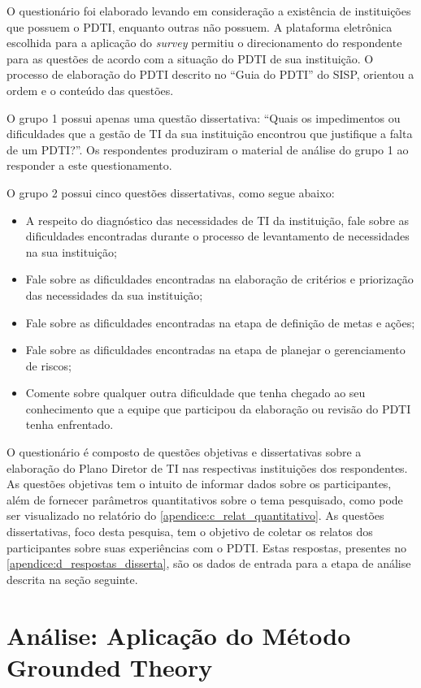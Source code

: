O questionário foi elaborado levando em consideração a existência de instituições que possuem o PDTI, enquanto outras não possuem. A plataforma eletrônica escolhida para a aplicação do \textit{survey} permitiu o direcionamento do respondente para as questões de acordo com a situação do PDTI de sua instituição. O processo de elaboração do PDTI descrito no ``Guia do PDTI'' do SISP, orientou a ordem e o conteúdo das questões.

O grupo 1 possui apenas uma questão dissertativa: ``Quais os impedimentos ou dificuldades que a gestão de TI da sua instituição encontrou que justifique a falta de um PDTI?''. Os respondentes produziram o material de análise do grupo 1 ao responder a este questionamento.

O grupo 2 possui cinco questões dissertativas, como segue abaixo:
\begin{itemize}
\item A respeito do diagnóstico das necessidades de TI da instituição, fale sobre as dificuldades encontradas durante o processo de levantamento de necessidades na sua instituição;
\item Fale sobre as dificuldades encontradas na elaboração de critérios e priorização das necessidades da sua instituição;
\item Fale sobre as dificuldades encontradas na etapa de definição de metas e ações;
\item Fale sobre as dificuldades encontradas na etapa de planejar o gerenciamento de riscos;
\item Comente sobre qualquer outra dificuldade que tenha chegado ao seu conhecimento que a equipe que participou da elaboração ou revisão do PDTI tenha enfrentado.
\end{itemize}

O questionário é composto de questões objetivas e dissertativas sobre a elaboração do Plano Diretor de TI nas respectivas instituições dos respondentes. As questões objetivas tem o intuito de informar dados sobre os participantes, além de fornecer parâmetros quantitativos sobre o tema pesquisado, como pode ser visualizado no relatório do \autoref{apendice:c_relat_quantitativo}. As questões dissertativas, foco desta pesquisa, tem o objetivo de coletar os relatos dos participantes sobre suas experiências com o PDTI. Estas respostas, presentes no \autoref{apendice:d_respostas_disserta}, são os dados de entrada para a etapa de análise descrita na seção seguinte.

\section{Análise: Aplicação do Método Grounded Theory}

